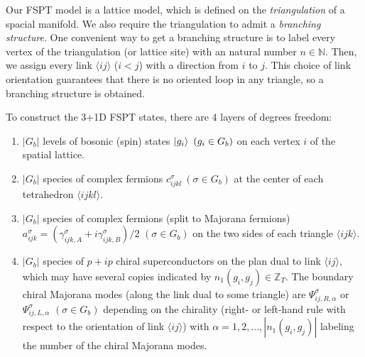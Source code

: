 \documentclass[%
 reprint,
 amsmath,amssymb,
 aps,
prb,
]{revtex4-2}
\begin{document}
Our FSPT model is a lattice model, which is defined on 
the \textit{triangulation} of a spacial manifold.
We also require the triangulation to admit a \textit{branching structure}.
One convenient way to get a branching structure is to label every vertex of the triangulation (or lattice site) with an natural number $n \in \mathbb N$.
Then, we assign every link $\langle ij \rangle$ ($i<j$) with a direction from $i$ to $j$.
This choice of link orientation guarantees that there is no oriented loop in any triangle, so a branching structure is obtained.

To construct the 3+1D FSPT states, there are 4 layers of degrees freedom:
\begin{enumerate}
\item $|G_{b} |$ levels of bosonic (spin) states $\ket{g_{i}} \ ( g_{i} \in G_{b})$ on each vertex $i$ of the spatial lattice.
\item $|G_{b} |$ species of complex fermions $c_{ijkl}^{\sigma } \ ( \sigma \in G_{b})$ at the center of each tetrahedron $\langle ijkl\rangle $.
\item $|G_{b} |$ species of complex fermions (split to Majorana fermions) $a_{ijk}^{\sigma } =\left( \gamma _{ijk,A}^{\sigma } +i\gamma _{ijk,B}^{\sigma }\right) /2$ $( \sigma \in G_{b})$ on the two sides of each triangle $\langle ijk\rangle $.
\item $|G_{b} |$ species of $p+ip$ chiral superconductors on the plan dual to link $\langle ij\rangle $, which may have several copies indicated by $n_{1}(g_{i}, g_{j}) \in \mathbb Z_{T}$.
The boundary chiral Majorana modes (along the link dual to some triangle) are $\Psi _{ij,R,\alpha}^{\sigma }$ or $\Psi _{ij,L,\alpha}^{\sigma }$ $(\sigma \in G_{b})$ depending on the chirality (right- or left-hand rule with respect to the orientation of link $\langle ij \rangle$) with $\alpha = 1,2,...,|n_{1}(g_{i}, g_{j})|$ labeling the number of the chiral Majorana modes.
\end{enumerate}
\end{document}
